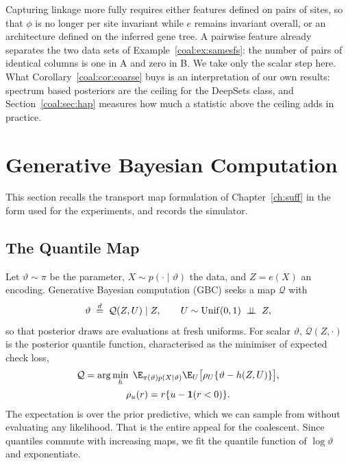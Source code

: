 Capturing linkage more fully requires either features defined on pairs of sites, so that $\phi$ is no longer per site invariant while $e$ remains invariant overall, or an architecture defined on the inferred gene tree. A pairwise feature already separates the two data sets of Example~\ref{coal:ex:samesfs}: the number of pairs of identical columns is one in A and zero in B. We take only the scalar step here. What Corollary~\ref{coal:cor:coarse} buys is an interpretation of our own results: spectrum based posteriors are the ceiling for the DeepSets class, and Section~\ref{coal:sec:hap} measures how much a statistic above the ceiling adds in practice.

\section{Generative Bayesian Computation}\label{coal:sec:gbc}

This section recalls the transport map formulation of Chapter~\ref{ch:suff} in the form used for the experiments, and records the simulator.

\subsection{The Quantile Map}\label{coal:sec:quantile}

Let $\vartheta\sim\pi$ be the parameter, $X\sim p(\cdot\mid\vartheta)$ the data, and $Z=e(X)$ an encoding. Generative Bayesian computation (GBC) seeks a map $\mathcal{Q}$ with
\begin{equation}\label{coal:eq:transport}
\vartheta\;\overset{d}{=}\;\mathcal{Q}(Z,U)\mid Z,\qquad U\sim\mathrm{Unif}(0,1)\;\perp\!\!\!\perp\;Z,
\end{equation}
so that posterior draws are evaluations at fresh uniforms. For scalar $\vartheta$, $\mathcal{Q}(Z,\cdot)$ is the posterior quantile function, characterised as the minimiser of expected check loss,
\begin{equation}\label{coal:eq:check}
\begin{gathered}
\mathcal{Q}=\arg\min_h\;\E_{\pi(\vartheta)p(X\mid\vartheta)}\E_U\bigl[\rho_U\{\vartheta-h(Z,U)\}\bigr],\\
\rho_u(r)=r\{u-\coalind(r<0)\}.
\end{gathered}
\end{equation}
The expectation is over the prior predictive, which we can sample from without evaluating any likelihood. That is the entire appeal for the coalescent. Since quantiles commute with increasing maps, we fit the quantile function of $\log\vartheta$ and exponentiate.

